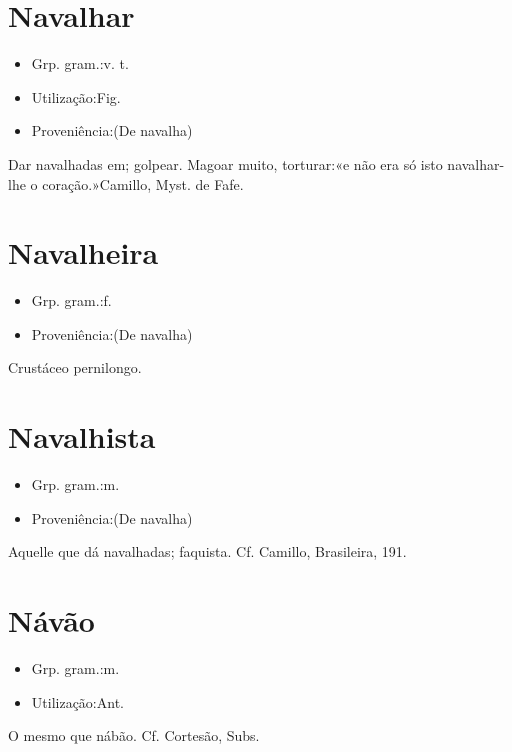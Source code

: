 \section{Navalhar}
\begin{itemize}
\item {Grp. gram.:v. t.}
\end{itemize}
\begin{itemize}
\item {Utilização:Fig.}
\end{itemize}
\begin{itemize}
\item {Proveniência:(De \textunderscore navalha\textunderscore )}
\end{itemize}
Dar navalhadas em; golpear.
Magoar muito, torturar:«\textunderscore e não era só isto navalhar-lhe o coração.\textunderscore »Camillo, \textunderscore Myst. de Fafe\textunderscore .
\section{Navalheira}
\begin{itemize}
\item {Grp. gram.:f.}
\end{itemize}
\begin{itemize}
\item {Proveniência:(De \textunderscore navalha\textunderscore )}
\end{itemize}
Crustáceo pernilongo.
\section{Navalhista}
\begin{itemize}
\item {Grp. gram.:m.}
\end{itemize}
\begin{itemize}
\item {Proveniência:(De \textunderscore navalha\textunderscore )}
\end{itemize}
Aquelle que dá navalhadas; faquista. Cf. Camillo, \textunderscore Brasileira\textunderscore , 191.
\section{Návão}
\begin{itemize}
\item {Grp. gram.:m.}
\end{itemize}
\begin{itemize}
\item {Utilização:Ant.}
\end{itemize}
O mesmo que \textunderscore nábão\textunderscore . Cf. Cortesão, \textunderscore Subs.\textunderscore 
